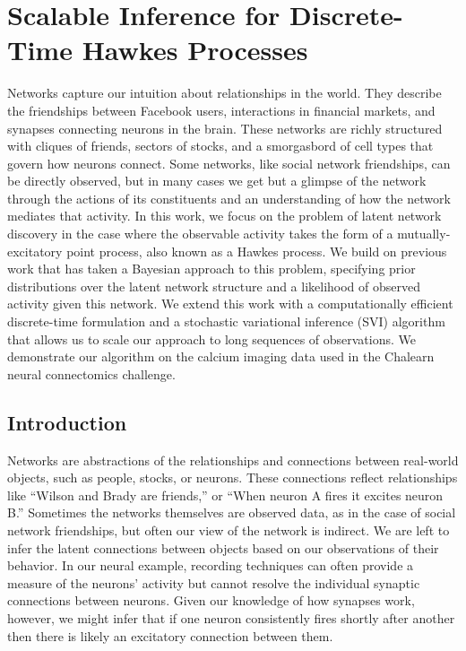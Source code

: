 \chapter{Scalable Inference for Discrete-Time Hawkes Processes}
 
Networks capture our intuition about relationships in the world.  They
describe the friendships between Facebook users, interactions in
financial markets, and synapses connecting neurons in the brain.
These networks are richly structured with cliques of friends, sectors
of stocks, and a smorgasbord of cell types that govern how neurons
connect.  Some networks, like social network friendships, can be
directly observed, but in many cases we get but a glimpse of the
network through the actions of its constituents and an understanding
of how the network mediates that activity.  In this work, we focus on
the problem of latent network discovery in the case where the
observable activity takes the form of a mutually-excitatory point
process, also known as a Hawkes process.  We build on previous work
that has taken a Bayesian approach to this problem, specifying prior
distributions over the latent network structure and a likelihood of
observed activity given this network.  We extend this work with a
computationally efficient discrete-time formulation and a stochastic
variational inference (SVI) algorithm that allows us to scale our
approach to long sequences of observations.  We demonstrate our
algorithm on the calcium imaging data used in the Chalearn neural
connectomics challenge.

\section{Introduction}

Networks are abstractions of the relationships and connections between
real-world objects, such as people, stocks, or neurons.  These
connections reflect relationships like ``Wilson and Brady are
friends,'' or ``When neuron A fires it excites neuron B.''  Sometimes
the networks themselves are observed data, as in the case of social
network friendships, but often our view of the network is indirect.
We are left to infer the latent connections between objects based on
our observations of their behavior.  In our neural example, recording
techniques can often provide a measure of the neurons' activity but
cannot resolve the individual synaptic connections between neurons.
Given our knowledge of how synapses work, however, we might infer that
if one neuron consistently fires shortly after another then there is
likely an excitatory connection between them.

